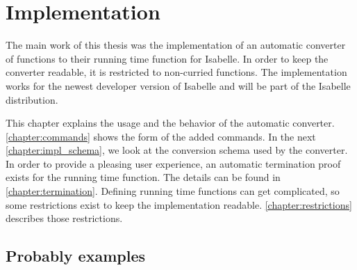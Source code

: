 
\chapter{Implementation}\label{chapter:impl}

The main work of this thesis was the implementation of an automatic converter of functions to their running time function for Isabelle.
In order to keep the converter readable, it is restricted to non-curried functions.
The implementation works for the newest developer version of Isabelle and will be part of the Isabelle distribution.

This chapter explains the usage and the behavior of the automatic converter.
\autoref{chapter:commands} shows the form of the added commands.
In the next \autoref{chapter:impl_schema}, we look at the conversion schema used by the converter.
In order to provide a pleasing user experience, an automatic termination proof exists for the running time function.
The details can be found in \autoref{chapter:termination}.
Defining running time functions can get complicated, so some restrictions exist to keep the implementation readable.
\autoref{chapter:restrictions} describes those restrictions.






\section{Probably examples}
